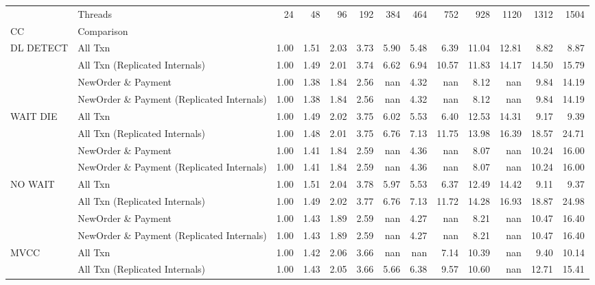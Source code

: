 \begin{tabular}{llrrrrrrrrrrr}
\toprule
       & Threads &  24   &  48   &  96   &  192  &  384  &  464  &  752  &  928  &  1120 &  1312 &  1504 \\
CC & Comparison &       &       &       &       &       &       &       &       &       &       &       \\
\midrule
DL DETECT & All Txn &  1.00 &  1.51 &  2.03 &  3.73 &  5.90 &  5.48 &  6.39 & 11.04 & 12.81 &  8.82 &  8.87 \\
       & All Txn (Replicated Internals) &  1.00 &  1.49 &  2.01 &  3.74 &  6.62 &  6.94 & 10.57 & 11.83 & 14.17 & 14.50 & 15.79 \\
       & NewOrder \& Payment &  1.00 &  1.38 &  1.84 &  2.56 &   nan &  4.32 &   nan &  8.12 &   nan &  9.84 & 14.19 \\
       & NewOrder \& Payment (Replicated Internals) &  1.00 &  1.38 &  1.84 &  2.56 &   nan &  4.32 &   nan &  8.12 &   nan &  9.84 & 14.19 \\
WAIT DIE & All Txn &  1.00 &  1.49 &  2.02 &  3.75 &  6.02 &  5.53 &  6.40 & 12.53 & 14.31 &  9.17 &  9.39 \\
       & All Txn (Replicated Internals) &  1.00 &  1.48 &  2.01 &  3.75 &  6.76 &  7.13 & 11.75 & 13.98 & 16.39 & 18.57 & 24.71 \\
       & NewOrder \& Payment &  1.00 &  1.41 &  1.84 &  2.59 &   nan &  4.36 &   nan &  8.07 &   nan & 10.24 & 16.00 \\
       & NewOrder \& Payment (Replicated Internals) &  1.00 &  1.41 &  1.84 &  2.59 &   nan &  4.36 &   nan &  8.07 &   nan & 10.24 & 16.00 \\
NO WAIT & All Txn &  1.00 &  1.51 &  2.04 &  3.78 &  5.97 &  5.53 &  6.37 & 12.49 & 14.42 &  9.11 &  9.37 \\
       & All Txn (Replicated Internals) &  1.00 &  1.49 &  2.02 &  3.77 &  6.76 &  7.13 & 11.72 & 14.28 & 16.93 & 18.87 & 24.98 \\
       & NewOrder \& Payment &  1.00 &  1.43 &  1.89 &  2.59 &   nan &  4.27 &   nan &  8.21 &   nan & 10.47 & 16.40 \\
       & NewOrder \& Payment (Replicated Internals) &  1.00 &  1.43 &  1.89 &  2.59 &   nan &  4.27 &   nan &  8.21 &   nan & 10.47 & 16.40 \\
MVCC & All Txn &  1.00 &  1.42 &  2.06 &  3.66 &   nan &   nan &  7.14 & 10.39 &   nan &  9.40 & 10.14 \\
       & All Txn (Replicated Internals) &  1.00 &  1.43 &  2.05 &  3.66 &  5.66 &  6.38 &  9.57 & 10.60 &   nan & 12.71 & 15.41 \\

\end{tabular}
